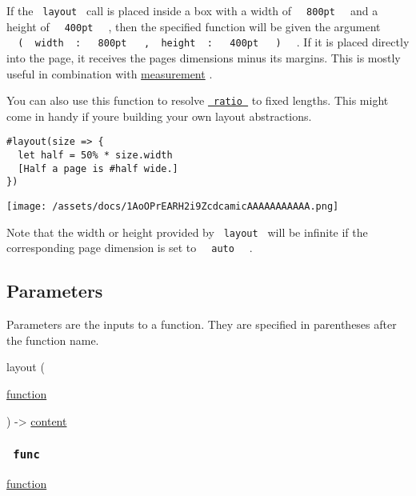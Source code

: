 If the \texttt{\ layout\ } call is placed inside a box with a width of
\texttt{\ }{\texttt{\ 800pt\ }}\texttt{\ } and a height of
\texttt{\ }{\texttt{\ 400pt\ }}\texttt{\ } , then the specified function
will be given the argument
\texttt{\ }{\texttt{\ (\ }}\texttt{\ width\ }{\texttt{\ :\ }}\texttt{\ }{\texttt{\ 800pt\ }}\texttt{\ }{\texttt{\ ,\ }}\texttt{\ height\ }{\texttt{\ :\ }}\texttt{\ }{\texttt{\ 400pt\ }}\texttt{\ }{\texttt{\ )\ }}\texttt{\ }
. If it is placed directly into the page, it receives the
page\textquotesingle s dimensions minus its margins. This is mostly
useful in combination with
\href{/docs/reference/layout/measure/}{measurement} .

You can also use this function to resolve
\href{/docs/reference/layout/ratio/}{\texttt{\ ratio\ }} to fixed
lengths. This might come in handy if you\textquotesingle re building
your own layout abstractions.

\begin{verbatim}
#layout(size => {
  let half = 50% * size.width
  [Half a page is #half wide.]
})
\end{verbatim}

\texttt{[image: /assets/docs/1AoOPrEARH2i9ZcdcamicAAAAAAAAAAA.png]}

Note that the width or height provided by \texttt{\ layout\ } will be
infinite if the corresponding page dimension is set to
\texttt{\ }{\texttt{\ auto\ }}\texttt{\ } .

\subsection{\texorpdfstring{{ Parameters
}}{ Parameters }}\label{parameters}

\label{parameters-tooltip}
Parameters are the inputs to a function. They are specified in
parentheses after the function name.

{ layout } (

{ \href{/docs/reference/foundations/function/}{function} }

) -\textgreater{} \href{/docs/reference/foundations/content/}{content}

\subsubsection{\texorpdfstring{\texttt{\ func\ }}{ func }}\label{parameters-func}

\href{/docs/reference/foundations/function/}{function}

